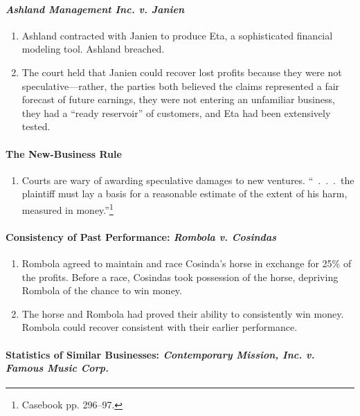 \paragraph{\emph{Ashland Management Inc. v. Janien}}

\begin{enumerate}
    \item Ashland contracted with Janien to produce Eta, a sophisticated 
    financial modeling tool. Ashland breached.
    \item The court held that Janien could recover lost profits because they 
    were not speculative---rather, the parties both believed the claims 
    represented a fair forecast of future earnings, they were not entering an 
    unfamiliar business, they had a ``ready reservoir'' of customers, and Eta 
    had been extensively tested.
\end{enumerate}

\paragraph{The New-Business Rule}

\begin{enumerate}
    \item Courts are wary of awarding speculative damages to new ventures. 
    ``~.~.~.~the plaintiff must lay a basis for a reasonable estimate of the 
    extent of his harm, measured in money.''\footnote{Casebook pp. 296--97.}
\end{enumerate}

\paragraph{Consistency of Past Performance: \emph{Rombola v. Cosindas}}

\begin{enumerate}
    \item Rombola agreed to maintain and race Cosinda's horse in exchange for 
    25\% of the profits. Before a race, Cosindas took possession of the horse, 
    depriving Rombola of the chance to win money.
    \item The horse and Rombola had proved their ability to consistently win 
    money. Rombola could recover consistent with their earlier performance.
\end{enumerate}

\paragraph{Statistics of Similar Businesses: \emph{Contemporary Mission, Inc. 
v. Famous Music Corp.}}

